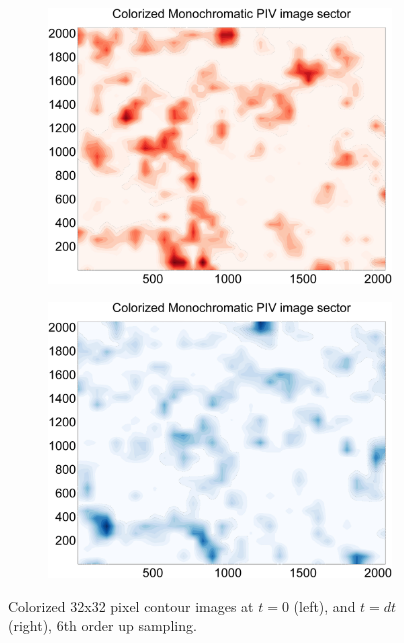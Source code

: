 \begin{figure}[H]
	\begin{subfigure}{.5\textwidth}
		\centering
		\includegraphics[width=.8\linewidth]{figs/piv_method/pive_figa_order6}
	\end{subfigure} 
	\begin{subfigure}{.5\textwidth}
		\centering
		\includegraphics[width=.8\linewidth]{figs/piv_method/pive_figb_order6}
	\end{subfigure}	
	\caption{Colorized 32x32 pixel contour images at $t=0$ (left), and $t=dt$ 
		(right), 6th order up sampling.}
	\label{fig:piv_sector_6up}
\end{figure}


